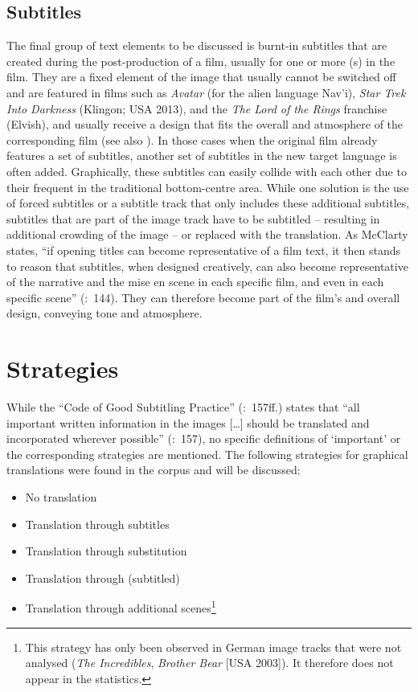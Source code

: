 \subsection{Subtitles}\label{sec:2.4.7}

The final group of text elements to be discussed is burnt-in subtitles that are created during the post-production of a film, usually for one or more (s) in the film. They are a fixed element of the image that usually cannot be switched off and are featured in films such as \textit{Avatar} (for the alien language Nav’i), \textit{Star Trek Into Darkness} (Klingon; USA 2013), and the \textit{The Lord of the Rings} franchise (Elvish), and usually receive a design that fits the overall  and atmosphere of the corresponding film (see also ). In those cases when the original film already features a set of  subtitles, another set of subtitles in the new target language is often added. Graphically, these subtitles can easily collide with each other due to their frequent  in the traditional bottom-centre area. While one solution is the use of forced subtitles or a subtitle track that only includes these additional subtitles, subtitles that are part of the image track have to be subtitled – resulting in additional crowding of the image – or replaced with the translation. As McClarty states, “if opening titles can become representative of a film text, it then stands to reason that subtitles, when designed creatively, can also become representative of the narrative and the mise en scene in each specific film, and even in each specific scene” (\citeyear{mcclarty2012}:~144). They can therefore become part of the film’s  and overall design, conveying tone and atmosphere.

\section{Strategies}\label{sec:2.5}

While the “Code of Good Subtitling Practice” (\citealt{Ivarsson1998}:~157ff.) states that “all important written information in the images […] should be translated and incorporated wherever possible” (\citealt{Ivarsson1998}:~157), no specific definitions of ‘important’ or the corresponding strategies are mentioned. The following strategies for graphical translations were found in the corpus and will be discussed:

\newpage 
\begin{itemize}
\item No translation
\item Translation through subtitles
\item Translation through substitution
\item Translation through (subtitled) 
\item Translation through additional scenes\footnote{This strategy has only been observed in German image tracks that were not analysed (\textit{The Incredibles}, \textit{Brother Bear} [USA 2003]). It therefore does not appear in the statistics.}
\end{itemize}

